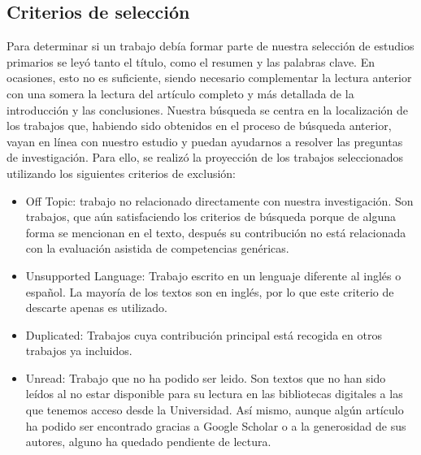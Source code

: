 \subsection{Criterios de selección}
Para determinar si un trabajo debía formar parte de nuestra selección de estudios primarios se leyó tanto el título, como el resumen y las palabras clave. En ocasiones, esto no es suficiente, siendo necesario complementar la lectura anterior con una somera la lectura del artículo completo y más detallada de la introducción y las conclusiones.
Nuestra búsqueda se centra en la localización de los trabajos que, habiendo sido obtenidos en el proceso de búsqueda anterior, vayan en línea con nuestro estudio y puedan ayudarnos a resolver las preguntas de investigación. Para ello, se realizó la proyección de los trabajos seleccionados utilizando los siguientes criterios de exclusión:
\begin{itemize}
\item Off Topic: trabajo no relacionado directamente con nuestra investigación. Son trabajos, que aún satisfaciendo los criterios de búsqueda porque de alguna forma se mencionan en el texto, después su contribución no está relacionada con la evaluación asistida de competencias genéricas.
\item Unsupported Language: Trabajo escrito en un lenguaje diferente al inglés o español. La mayoría de los textos son en inglés, por lo que este criterio de descarte apenas es utilizado.
\item Duplicated: Trabajos cuya contribución principal está recogida en otros trabajos ya incluidos. 
\item Unread: Trabajo que no ha podido ser leido. Son textos que no han sido leídos al no estar disponible para su lectura en las bibliotecas digitales a las que tenemos acceso desde la Universidad. Así mismo, aunque algún artículo ha podido ser encontrado gracias a Google Scholar o a la generosidad de sus autores, alguno ha quedado pendiente de lectura.
\end{itemize}


